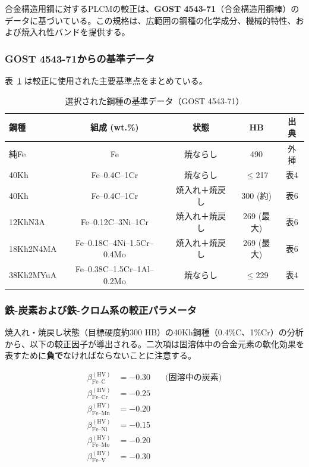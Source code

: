 \documentclass[12pt,a4paper]{article}
\begin{document}
	合金構造用鋼に対するPLCMの較正は、\textbf{GOST 4543-71}（合金構造用鋼棒）のデータに基づいている。この規格は、広範囲の鋼種の化学成分、機械的特性、および焼入れ性バンドを提供する。
	
	\subsubsection{GOST 4543-71からの基準データ}
	
	表~\ref{tab:steel_gost4543} は較正に使用された主要基準点をまとめている。
	
	\begin{table}[htbp]
		\centering
		\caption{選択された鋼種の基準データ（GOST 4543-71）}
		\label{tab:steel_gost4543}
		\begin{tabular}{lcccc}
			\toprule
			\textbf{鋼種} & \textbf{組成 (wt.\%)} & \textbf{状態} & \textbf{HB} & \textbf{出典} \\
			\midrule
			純Fe & Fe & 焼ならし & 490 & 外挿 \\
			40Kh & Fe–0.4C–1Cr & 焼ならし & $\le$217 & 表4 \\
			40Kh & Fe–0.4C–1Cr & 焼入れ＋焼戻し & 300 (約) & 表6 \\
			12KhN3A & Fe–0.12C–3Ni–1Cr & 焼入れ＋焼戻し & 269 (最大) & 表6 \\
			18Kh2N4MA & Fe–0.18C–4Ni–1.5Cr–0.4Mo & 焼入れ＋焼戻し & 269 (最大) & 表6 \\
			38Kh2MYuA & Fe–0.38C–1.5Cr–1Al–0.2Mo & 焼ならし & $\le$229 & 表4 \\
			\bottomrule
		\end{tabular}
	\end{table}
	
	\subsubsection{鉄-炭素および鉄-クロム系の較正パラメータ}
	
	焼入れ・焼戻し状態（目標硬度約300 HB）の40Kh鋼種（0.4\%C、1\%Cr）の分析から、以下の較正因子が導出される。二次項は固溶体中の合金元素の軟化効果を表すために\textbf{負で}なければならないことに注意する。
	
	\[
	\begin{aligned}
		\beta_{\text{Fe–C}}^{(\text{HV})} &= -0.30 \quad &\text{(固溶中の炭素)} \\
		\beta_{\text{Fe–Cr}}^{(\text{HV})} &= -0.25 \\
		\beta_{\text{Fe–Mn}}^{(\text{HV})} &= -0.20 \\
		\beta_{\text{Fe–Ni}}^{(\text{HV})} &= -0.15 \\
		\beta_{\text{Fe–Mo}}^{(\text{HV})} &= -0.20 \\
		\beta_{\text{Fe–V}}^{(\text{HV})} &= -0.30
	\end{aligned}
	\]
	
\end{document}
